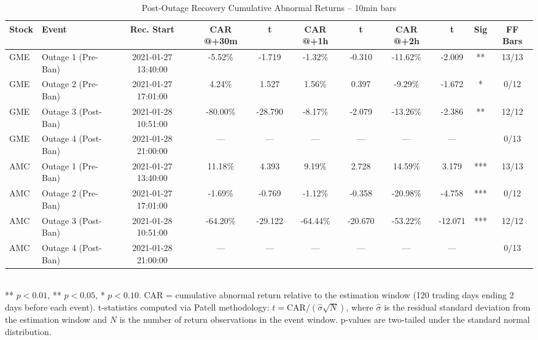 \begin{table}[htbp]
  \centering
  \caption{Post-Outage Recovery Cumulative Abnormal Returns -- 10min bars}
  \label{tab:recovery_10min}
  \begin{tabular}{llccccccccc}
    \hline\hline
    Stock & Event & Rec. Start & CAR @+30m & t & CAR @+1h & t & CAR @+2h & t & Sig & FF Bars \\
    \hline
    GME & Outage 1 (Pre-Ban) & 2021-01-27 13:40:00 & -5.52\% & -1.719 & -1.32\% & -0.310 & -11.62\% & -2.009 & ** & 13/13 \\
    GME & Outage 2 (Pre-Ban) & 2021-01-27 17:01:00 & 4.24\% & 1.527 & 1.56\% & 0.397 & -9.29\% & -1.672 & * & 0/12 \\
    GME & Outage 3 (Post-Ban) & 2021-01-28 10:51:00 & -80.00\% & -28.790 & -8.17\% & -2.079 & -13.26\% & -2.386 & ** & 12/12 \\
    GME & Outage 4 (Post-Ban) & 2021-01-28 21:00:00 & — & — & — & — & — & — &  & 0/13 \\
    \hline
    AMC & Outage 1 (Pre-Ban) & 2021-01-27 13:40:00 & 11.18\% & 4.393 & 9.19\% & 2.728 & 14.59\% & 3.179 & *** & 13/13 \\
    AMC & Outage 2 (Pre-Ban) & 2021-01-27 17:01:00 & -1.69\% & -0.769 & -1.12\% & -0.358 & -20.98\% & -4.758 & *** & 0/12 \\
    AMC & Outage 3 (Post-Ban) & 2021-01-28 10:51:00 & -64.20\% & -29.122 & -64.44\% & -20.670 & -53.22\% & -12.071 & *** & 12/12 \\
    AMC & Outage 4 (Post-Ban) & 2021-01-28 21:00:00 & — & — & — & — & — & — &  & 0/13 \\
    \hline\hline
  \end{tabular}
  \\[4pt]
  {\small *** $p<0.01$, ** $p<0.05$, * $p<0.10$. CAR = cumulative abnormal return relative to the estimation window (120 trading days ending 2 days before each event). t-statistics computed via Patell methodology: $t = \text{CAR} / (\hat{\sigma} \sqrt{N})$, where $\hat{\sigma}$ is the residual standard deviation from the estimation window and $N$ is the number of return observations in the event window. p-values are two-tailed under the standard normal distribution.}
\end{table}
